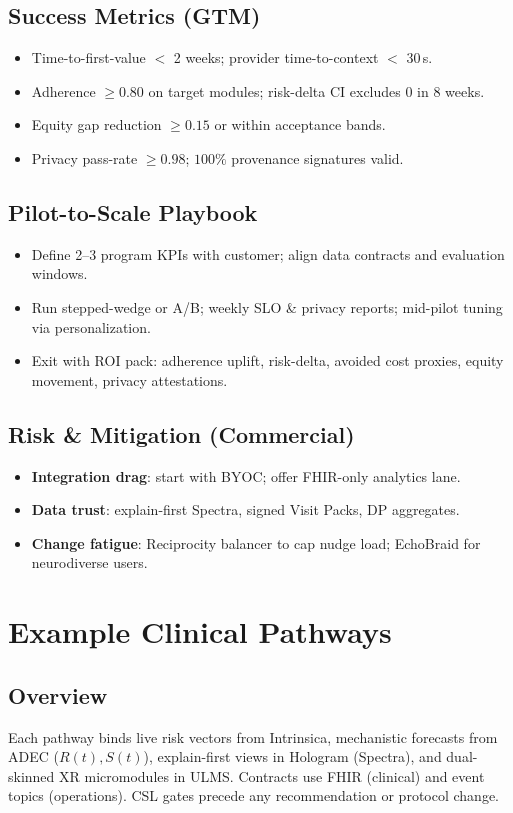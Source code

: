 \documentclass[11pt]{article}
\theoremstyle{plain}
\begin{document}
\subsection{Success Metrics (GTM)}
\begin{itemize}
  \item Time-to-first-value $<$ 2 weeks; provider time-to-context $<$ 30\,s.
  \item Adherence $\ge 0.80$ on target modules; risk-delta CI excludes 0 in 8 weeks.
  \item Equity gap reduction $\ge 0.15$ or within acceptance bands.
  \item Privacy pass-rate $\ge 0.98$; $100\%$ provenance signatures valid.
\end{itemize}

\subsection{Pilot-to-Scale Playbook}
\begin{itemize}
  \item Define 2–3 program KPIs with customer; align data contracts and evaluation windows.
  \item Run stepped-wedge or A/B; weekly SLO \& privacy reports; mid-pilot tuning via personalization.
  \item Exit with ROI pack: adherence uplift, risk-delta, avoided cost proxies, equity movement, privacy attestations.
\end{itemize}

\subsection{Risk \& Mitigation (Commercial)}
\begin{itemize}
  \item \textbf{Integration drag}: start with BYOC; offer FHIR-only analytics lane.
  \item \textbf{Data trust}: explain-first Spectra, signed Visit Packs, DP aggregates.
  \item \textbf{Change fatigue}: Reciprocity balancer to cap nudge load; EchoBraid for neurodiverse users.
\end{itemize}


\section{Example Clinical Pathways}

\subsection{Overview}
Each pathway binds live risk vectors from Intrinsica, mechanistic forecasts from ADEC ($R(t),S(t)$), explain-first views in Hologram (Spectra), and dual-skinned XR micromodules in ULMS. Contracts use FHIR (clinical) and event topics (operations). CSL gates precede any recommendation or protocol change.
\end{document}

